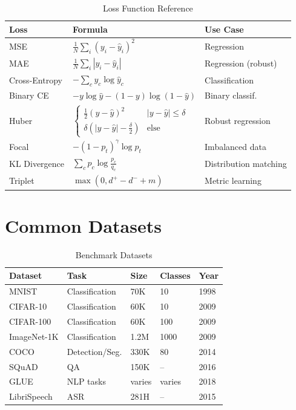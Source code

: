 \begin{table}[ht]
    \centering
    \caption{Loss Function Reference}
    \begin{tabular}{L{2.5cm} L{5cm} L{4.5cm}}
        \toprule
        \textbf{Loss} & \textbf{Formula} & \textbf{Use Case} \\
        \midrule
        MSE & $\frac{1}{N}\sum_{i}(y_i - \hat{y}_i)^2$ & Regression \\
        MAE & $\frac{1}{N}\sum_{i}|y_i - \hat{y}_i|$ & Regression (robust) \\
        Cross-Entropy & $-\sum_c y_c \log\hat{y}_c$ & Classification \\
        Binary CE & $-y\log\hat{y} - (1-y)\log(1-\hat{y})$ & Binary classif. \\
        Huber & $\begin{cases}\frac{1}{2}(y-\hat{y})^2 & |y-\hat{y}| \leq \delta \\ \delta(|y-\hat{y}|-\frac{\delta}{2}) & \text{else}\end{cases}$ & Robust regression \\
        Focal & $-(1-p_t)^\gamma \log p_t$ & Imbalanced data \\
        KL Divergence & $\sum_c p_c \log\frac{p_c}{q_c}$ & Distribution matching \\
        Triplet & $\max(0, d^+ - d^- + m)$ & Metric learning \\
        \bottomrule
    \end{tabular}
\end{table}

\section{Common Datasets}

\begin{table}[ht]
    \centering
    \caption{Benchmark Datasets}
    \begin{tabular}{L{2cm} L{2cm} L{2cm} L{3cm} L{2.5cm}}
        \toprule
        \textbf{Dataset} & \textbf{Task} & \textbf{Size} & \textbf{Classes} & \textbf{Year} \\
        \midrule
        MNIST & Classification & 70K & 10 & 1998 \\
        CIFAR-10 & Classification & 60K & 10 & 2009 \\
        CIFAR-100 & Classification & 60K & 100 & 2009 \\
        ImageNet-1K & Classification & 1.2M & 1000 & 2009 \\
        COCO & Detection/Seg. & 330K & 80 & 2014 \\
        SQuAD & QA & 150K & -- & 2016 \\
        GLUE & NLP tasks & varies & varies & 2018 \\
        LibriSpeech & ASR & 281H & -- & 2015 \\
        \bottomrule
    \end{tabular}
\end{table}

